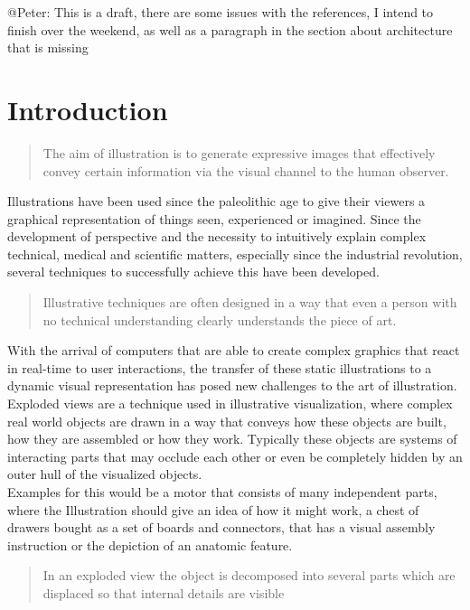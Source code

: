 @Peter: This is a draft, there are some issues with the references,  I intend to finish over the weekend, as well as a paragraph in the section about architecture that is missing

\chapter{Introduction}

\begin{quote}
The aim of illustration is to generate expressive images that effectively convey certain information via the visual channel to the human observer.\cite{Viola:2005:SVV:2381219.2381249}
\end{quote}

Illustrations have been used since the paleolithic age\cite{Viola-05-Smart} to give their viewers a graphical representation of things seen, experienced or imagined\cite{misc:WikiEnVIs}. Since the development of perspective and the necessity to intuitively explain complex technical, medical and scientific matters, especially since the industrial revolution, several techniques to successfully achieve this have been developed.
\begin{quote}
Illustrative techniques are often designed in a way that even a person with no technical understanding clearly understands the piece of art.\cite{Viola-05-Smart}
\end{quote}
With the arrival of computers that are able to create complex graphics that react in real-time to user interactions, the transfer of these static illustrations to a dynamic visual representation has posed new challenges to the art of illustration.
Exploded views are a technique used in illustrative visualization, where complex real world objects are drawn in a way that conveys how these objects are built, how they are assembled or how they work. Typically these objects are systems of interacting parts that may occlude each other or even be completely hidden by an outer hull of the visualized objects.\\
Examples for this would be a motor that consists of many independent parts, where the Illustration should give an idea of how it might work, a chest of drawers bought as a set of boards and connectors, that has a visual assembly instruction or the depiction of an anatomic feature.\\
\begin{quote}
In an exploded view the object is decomposed into several parts which are displaced so that internal details are visible \cite{proc:bruckner-2006-EVV}
\end{quote}

